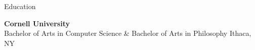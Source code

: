 
\begin{rSection}{Education}

	{\bf \large{Cornell University}} \hfill \color{darkgray}{08/2021 - 05/2025}
	\\ 
	Bachelor of Arts in Computer Science \& Bachelor of Arts in Philosophy \hfill Ithaca, NY
	
	\color{black}

\end{rSection}